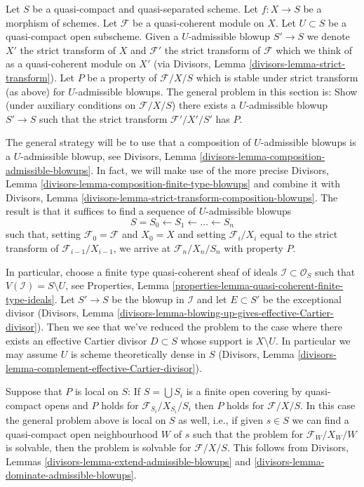 \begin{remark}
\label{remark-successive-blowups}
Let $S$ be a quasi-compact and quasi-separated scheme. Let $f : X \to S$
be a morphism of schemes. Let $\mathcal{F}$ be a quasi-coherent module on $X$.
Let $U \subset S$ be a quasi-compact open subscheme. Given a $U$-admissible
blowup $S' \to S$ we denote $X'$ the strict transform of $X$ and $\mathcal{F}'$
the strict transform of $\mathcal{F}$ which we think of as a quasi-coherent
module on $X'$ (via Divisors, Lemma \ref{divisors-lemma-strict-transform}).
Let $P$ be a property of $\mathcal{F}/X/S$ which is stable under strict
transform (as above) for $U$-admissible blowups. The general problem in
this section is: Show (under auxiliary conditions on $\mathcal{F}/X/S$)
there exists a $U$-admissible blowup $S' \to S$
such that the strict transform $\mathcal{F}'/X'/S'$ has $P$.

\medskip\noindent
The general strategy will be to use that a composition of
$U$-admissible blowups is a $U$-admissible blowup, see
Divisors, Lemma \ref{divisors-lemma-composition-admissible-blowups}.
In fact, we will make use of the more precise
Divisors, Lemma \ref{divisors-lemma-composition-finite-type-blowups}
and combine it with
Divisors, Lemma \ref{divisors-lemma-strict-transform-composition-blowups}.
The result is that it suffices to find a sequence of $U$-admissible
blowups
$$
S = S_0 \leftarrow S_1 \leftarrow \ldots \leftarrow S_n
$$
such that, setting $\mathcal{F}_0 = \mathcal{F}$ and $X_0 = X$ and setting
$\mathcal{F}_i/X_i$ equal to the strict transform of
$\mathcal{F}_{i - 1}/X_{i - 1}$, we
arrive at $\mathcal{F}_n/X_n/S_n$ with property $P$.

\medskip\noindent
In particular, choose a finite type quasi-coherent sheaf of ideals
$\mathcal{I} \subset \mathcal{O}_S$ such that $V(\mathcal{I}) = S \setminus U$,
see Properties, Lemma \ref{properties-lemma-quasi-coherent-finite-type-ideals}.
Let $S' \to S$ be the blowup in $\mathcal{I}$ and let $E \subset S'$
be the exceptional divisor (Divisors, Lemma
\ref{divisors-lemma-blowing-up-gives-effective-Cartier-divisor}).
Then we see that we've reduced the
problem to the case where there exists an effective Cartier divisor
$D \subset S$ whose support is $X \setminus U$. In particular we may
assume $U$ is scheme theoretically dense in $S$
(Divisors, Lemma \ref{divisors-lemma-complement-effective-Cartier-divisor}).

\medskip\noindent
Suppose that $P$ is local on $S$: If $S = \bigcup S_i$ is a finite open
covering by quasi-compact opens and $P$ holds for
$\mathcal{F}_{S_i}/X_{S_i}/S_i$ then $P$ holds for $\mathcal{F}/X/S$.
In this case the general problem above is local on $S$ as well, i.e.,
if given $s \in S$ we can find a quasi-compact open neighbourhood $W$ of $s$
such that the problem for $\mathcal{F}_W/X_W/W$ is solvable, then the
problem is solvable for $\mathcal{F}/X/S$. This follows from
Divisors, Lemmas \ref{divisors-lemma-extend-admissible-blowups} and
\ref{divisors-lemma-dominate-admissible-blowups}.
\end{remark}

